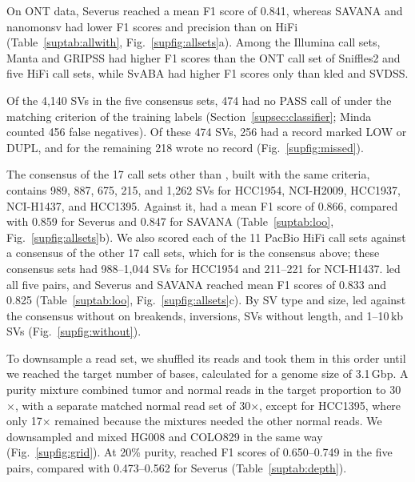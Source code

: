 \FloatBarrier
{}

On ONT data, Severus reached a mean F1 score of 0.841, whereas SAVANA and nanomonsv had lower F1 scores and precision than on HiFi (Table~\ref{suptab:allwith}, Fig.~\ref{supfig:allsets}a).
Among the Illumina call sets, Manta and GRIPSS had higher F1 scores than the ONT call set of Sniffles2 and five HiFi call sets, while SvABA had higher F1 scores only than kled and SVDSS.


Of the 4,140 SVs in the five consensus sets, 474 had no PASS call of \tool{} under the matching criterion of the training labels (Section~\ref{supsec:classifier}; Minda counted 456 false negatives).
Of these 474 SVs, 256 had a record marked LOW or DUPL, and for the remaining 218 \tool{} wrote no record (Fig.~\ref{supfig:missed}).


The consensus of the 17 call sets other than \tool{}, built with the same criteria, contains 989, 887, 675, 215, and 1,262 SVs for HCC1954, NCI-H2009, HCC1937, NCI-H1437, and HCC1395.
Against it, \tool{} had a mean F1 score of 0.866, compared with 0.859 for Severus and 0.847 for SAVANA (Table~\ref{suptab:loo}, Fig.~\ref{supfig:allsets}b).
We also scored each of the 11 PacBio HiFi call sets against a consensus of the other 17 call sets, which for \tool{} is the consensus above; these consensus sets had 988--1,044 SVs for HCC1954 and 211--221 for NCI-H1437.
\tool{} led all five pairs, and Severus and SAVANA reached mean F1 scores of 0.833 and 0.825 (Table~\ref{suptab:loo}, Fig.~\ref{supfig:allsets}c).
By SV type and size, \tool{} led against the consensus without \tool{} on breakends, inversions, SVs without length, and 1--10\,kb SVs (Fig.~\ref{supfig:without}).


To downsample a read set, we shuffled its reads and took them in this order until we reached the target number of bases, calculated for a genome size of 3.1\,Gbp.
A purity mixture combined tumor and normal reads in the target proportion to 30$\times$, with a separate matched normal read set of 30$\times$, except for HCC1395, where only 17$\times$ remained because the mixtures needed the other normal reads.
We downsampled and mixed HG008 and COLO829 in the same way (Fig.~\ref{supfig:grid}).
At 20\% purity, \tool{} reached F1 scores of 0.650--0.749 in the five pairs, compared with 0.473--0.562 for Severus (Table~\ref{suptab:depth}).


